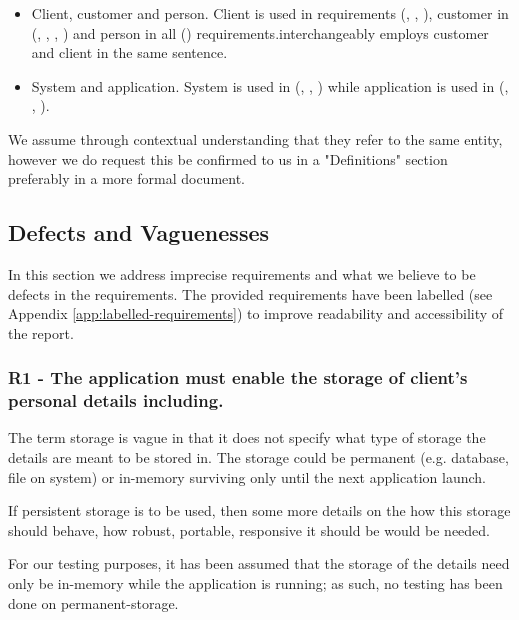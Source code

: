 \begin{itemize} 
	\item Client, customer and person. Client is used in requirements (\ROne, \RTwo, \RFive), customer in (\RTwo, \RThree, \RFour, \RFive) and person in all (\REight) requirements.\RFive \space interchangeably employs customer and client in the same sentence. 
	\item System and application. System is used in (\RTwo, \RSix, \RSeven) while application is used in (\ROne, \RFour, \RFive).
\end{itemize}

We assume through contextual understanding that they refer to the same entity, however we do request this be confirmed to us in a "Definitions" section preferably in a more formal document.
\par


\subsection{Defects and Vaguenesses}

In this section we address imprecise requirements and what we believe to be defects in the requirements. The provided requirements have been labelled (see Appendix \ref{app:labelled-requirements}) to improve readability and accessibility of the report. 

\subsubsection{R1 - The application must enable the storage of client’s personal details including. }

The term storage is vague in that it does not specify what type of storage the details are meant to be stored in. The storage could be permanent (e.g. database, file on system) or in-memory surviving only until the next application launch. 
\par
If persistent storage is to be used, then some more details on the how this storage should behave, how robust, portable, responsive it should be would be needed. 
\par
For our testing purposes, it has been assumed that the storage of the details need only be in-memory while the application is running; as such, no testing has been done on permanent-storage.

